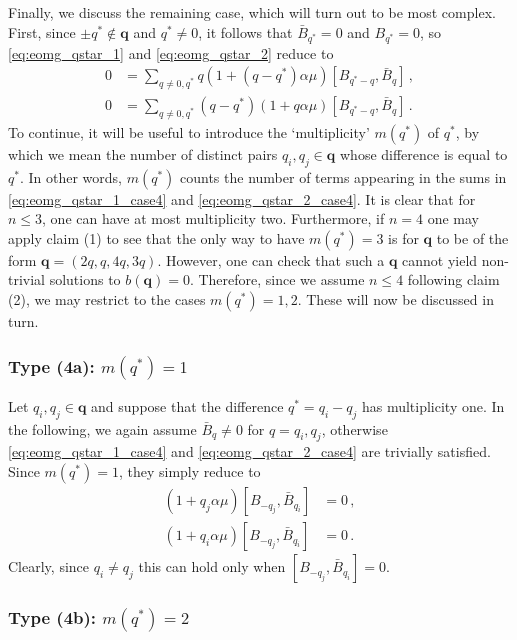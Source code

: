 \documentclass[11pt,a4paper]{article}
\numberwithin{equation}{section}
\numberwithin{table}{section}\setlength{\multlinegap}{25pt}
\begin{document}
Finally, we discuss the remaining case, which will turn out to be most complex. First, since $\pm q^*\not\in\mathbf{q}$ and $q^*\neq 0$, it follows that $\bar{B}_{q^*}=0$ and $B_{q^*}=0$, so \eqref{eq:eomg_qstar_1} and \eqref{eq:eomg_qstar_2} reduce to 
\begin{align}
	\label{eq:eomg_qstar_1_case4}	0&= \sum_{q\neq 0,q^*}q (1+(q-q^*)\alpha\mu)[B_{q^*-q}, \bar{B}_{q}]\,,\\
	\label{eq:eomg_qstar_2_case4}	0&=\sum_{q\neq 0,q^*}(q-q^*)(1+q\alpha\mu)[B_{q^*-q}, \bar{B}_{q}]\,.
\end{align}
To continue, it will be useful to introduce the `multiplicity' $m(q^*)$ of $q^*$, by which we mean the number of distinct pairs $q_i,q_j\in\mathbf{q}$ whose difference is equal to $q^*$. In other words, $m(q^*)$ counts the number of terms appearing in the sums in \eqref{eq:eomg_qstar_1_case4} and \eqref{eq:eomg_qstar_2_case4}. It is clear that for $n\leq 3$, one can have at most multiplicity two. Furthermore, if $n=4$ one may apply claim (1) to see that the only way to have $m(q^*)=3$ is for $\mathbf{q}$ to be of the form $\mathbf{q}=(2q,q,4q,3q)$. However, one can check that such a $\mathbf{q}$ cannot yield non-trivial solutions to $b(\mathbf{q})=0$. Therefore, since we assume $n\leq 4$ following claim (2), we may restrict to the cases $m(q^*)=1,2$. These will now be discussed in turn. 

\subsubsection*{Type (4a): $m(q^*)=1$}

Let $q_i,q_j\in\mathbf{q}$ and suppose that the difference $q^*=q_i-q_j$ has multiplicity one. In the following, we again assume $\bar{B}_q\neq 0$ for $q=q_i,q_j$, otherwise \eqref{eq:eomg_qstar_1_case4} and \eqref{eq:eomg_qstar_2_case4} are trivially satisfied. Since $m(q^*)=1$, they simply reduce to
\begin{align}
	(1+q_j\alpha \mu)[B_{-q_j},\bar{B}_{q_i}]&=0\,,\\
	(1+q_i\alpha\mu)[B_{-q_j},\bar{B}_{q_i}]&=0\,.
\end{align}
Clearly, since $q_i\neq q_j$ this can hold only when $[B_{-q_j},\bar{B}_{q_i}]=0$. 

\subsubsection*{Type (4b): $m(q^*)=2$}
\end{document}
